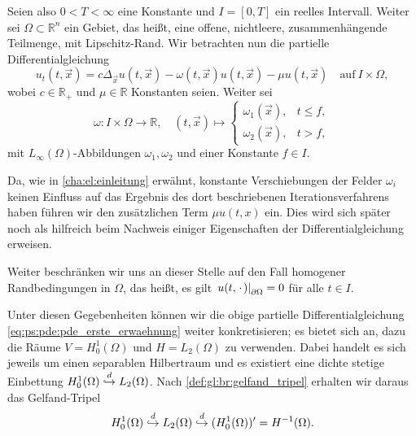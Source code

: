 Seien also $0 < T < \infty$ eine Konstante und $I = [0, T]$ ein reelles Intervall.
Weiter sei $\Omega \subset \mathbb{R}^{n}$ ein Gebiet, das heißt, eine offene, nichtleere, zusammenhängende Teilmenge, mit Lipschitz-Rand.
Wir betrachten nun die partielle Differentialgleichung
\begin{equation}
\label{eq:ps:pde:pde_erste_erwaehnung}
    u_{t}(t, \vec{x}) = c \Delta_{\vec{x}} u(t, \vec{x}) - \omega(t, \vec{x}) u(t, \vec{x}) - \mu u(t, \vec{x}) \quad \text{auf}~I \times \Omega,
\end{equation}
wobei $c \in \mathbb{R}_{+}$ und $\mu \in \mathbb{R}$ Konstanten seien.
Weiter sei
\begin{equation}
\label{eq:ps:pde:omega_definition}
    \omega \colon I \times \Omega \to \mathbb{R}, \quad (t, \vec{x}) \mapsto
    \begin{cases}
        \omega_{1}(\vec{x}), & t \leq f, \\
        \omega_{2}(\vec{x}), & t > f,
    \end{cases}
\end{equation}
mit $L_{\infty}(\Omega)$-Abbildungen $\omega_{1}, \omega_{2}$ und einer Konstante $f \in I$.

Da, wie in \cref{cha:el:einleitung} erwähnt, konstante Verschiebungen der Felder $\omega_{i}$ keinen Einfluss auf das Ergebnis des dort beschriebenen Iterationsverfahrens haben führen wir den zusätzlichen Term $\mu u(t, x)$ ein.
Dies wird sich später noch als hilfreich beim Nachweis einiger Eigenschaften der Differentialgleichung erweisen.

Weiter beschränken wir uns an dieser Stelle auf den Fall homogener Randbedingungen in $\Omega$, das heißt, es gilt $\left.u(t, {\mkern2mu\cdot\mkern2mu})\right|_{\partial \Omega} = 0$ für alle $t \in I$.

Unter diesen Gegebenheiten können wir die obige partielle Differentialgleichung \cref{eq:ps:pde:pde_erste_erwaehnung} weiter konkretisieren; es bietet sich an, dazu die Räume $V = H^{1}_{0}(\Omega)$ und $H = L_{2}(\Omega)$ zu verwenden.
Dabei handelt es sich jeweils um einen separablen Hilbertraum und es existiert eine dichte stetige Einbettung $H^{1}_{0}(\Omega) \stackrel{d}{\hookrightarrow} L_{2}(\Omega)$.
Nach \cref{def:gl:br:gelfand_tripel} erhalten wir daraus das Gelfand-Tripel
\begin{equation}
\label{eq:ps:pde:gelfand_triple}
    H^{1}_{0}(\Omega) \stackrel{d}{\hookrightarrow} L_{2}(\Omega) \stackrel{d}{\hookrightarrow} (H^{1}_{0}(\Omega))' = H^{-1}(\Omega).
\end{equation}

